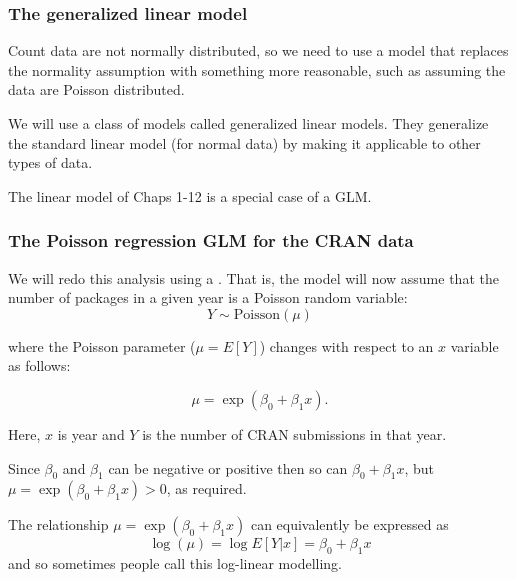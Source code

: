 \documentclass{beamer}\usepackage[]{graphicx}\usepackage[]{xcolor}
\begin{document}



\begin{frame}[fragile]
\frametitle{The generalized linear model}
Count data are not normally distributed, so we need to use a model that replaces the normality assumption with something more reasonable, such as assuming the data are Poisson distributed.
\bigskip

We will use a class of models called generalized linear models. They generalize the standard linear model (for normal data) by making it applicable to other types of data.
\bigskip

The linear model of Chaps 1-12 is a special case of a GLM.
\end{frame}



\begin{frame}[fragile]
\frametitle{The Poisson regression GLM for the CRAN data}
We will redo this analysis using a . That is, the model will now assume that the number of packages in a given year is a Poisson random variable:
\vspace{-0.5em}
\[ Y \sim \text{Poisson}(\mu) \]
\vspace{-1.5em}

where the Poisson parameter ($\mu=E[Y]$) changes with respect to an $x$ variable as follows:
\vspace{-1.5em}

\[ \mu = \exp(\beta_0 + \beta_1 x). \]
\vspace{-1.5em}

Here, $x$ is year and $Y$ is the number of CRAN submissions in that year.
\medskip 

Since $\beta_0$ and $\beta_1$ can be negative or positive then so can $\beta_0 + \beta_1 x$, but $\mu = \exp(\beta_0 + \beta_1 x) > 0$, as required.
\medskip

The relationship $\mu = \exp(\beta_0 + \beta_1 x)$ can equivalently be expressed as 
\[\log(\mu) = \log E[Y|x] = \beta_0 + \beta_1 x \] 
and so sometimes people call this log-linear modelling.
\end{frame}
\end{document}
